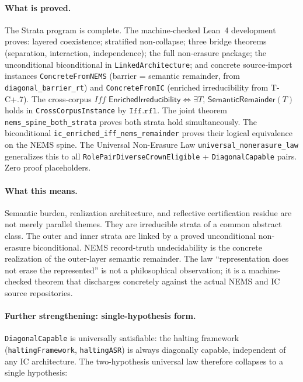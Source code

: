 \documentclass[11pt]{article}
\newcommand{\SemRem}{\ensuremath{\mathsf{SemanticRemainder}}}
\newcommand{\EnrIrr}{\ensuremath{\mathsf{EnrichedIrreducibility}}}
\begin{document}
\paragraph{What is proved.}
The Strata program is complete.  The machine-checked Lean~4 development proves:
layered coexistence; stratified non-collapse; three bridge theorems (separation,
interaction, independence); the full non-erasure package; the unconditional
biconditional in \texttt{LinkedArchitecture}; and concrete source-import instances
\texttt{ConcreteFromNEMS} (barrier = semantic remainder, from \texttt{diagonal\_barrier\_rt})
and \texttt{ConcreteFromIC} (enriched irreducibility from T-C+.7).
The cross-corpus $\mathit{Iff}$
$\EnrIrr \iff \exists T,\,\SemRem(T)$
holds in \texttt{CrossCorpusInstance} by $\mathtt{Iff.rfl}$.
The joint theorem \texttt{nems\_spine\_both\_strata} proves both strata hold
simultaneously.  The biconditional \texttt{ic\_enriched\_iff\_nems\_remainder} proves
their logical equivalence on the NEMS spine.  The Universal Non-Erasure Law
\texttt{universal\_nonerasure\_law} generalizes this to all
\texttt{RolePairDiverseCrownEligible} + \texttt{DiagonalCapable} pairs.
Zero proof placeholders.

\paragraph{What this means.}
Semantic burden, realization architecture, and reflective certification residue are not
merely parallel themes.  They are irreducible strata of a common abstract class.  The
outer and inner strata are linked by a proved unconditional non-erasure biconditional.
NEMS record-truth undecidability is the concrete realization of the outer-layer semantic
remainder.  The law ``representation does not erase the represented'' is not a
philosophical observation; it is a machine-checked theorem that discharges concretely
against the actual NEMS and IC source repositories.

\paragraph{Further strengthening: single-hypothesis form.}
\texttt{DiagonalCapable} is universally satisfiable: the halting framework
(\texttt{haltingFramework}, \texttt{haltingASR}) is always diagonally capable,
independent of any IC architecture.  The two-hypothesis universal law therefore
collapses to a single hypothesis:
\end{document}
